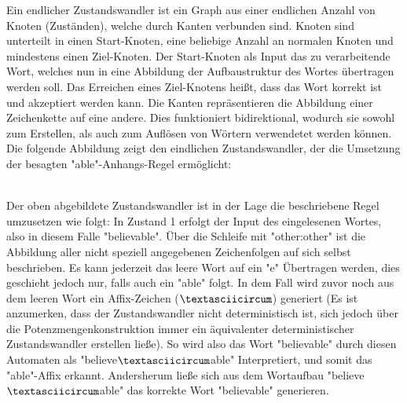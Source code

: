 \documentclass[12pt]{article}
\begin{document}
Ein endlicher Zustandswandler ist ein Graph aus einer endlichen Anzahl von Knoten (Zuständen), welche durch Kanten verbunden sind. Knoten sind unterteilt in einen Start-Knoten, eine beliebige Anzahl an normalen Knoten und mindestens einen Ziel-Knoten. Der Start-Knoten als Input das zu verarbeitende Wort, welches nun in eine Abbildung der Aufbaustruktur des Wortes übertragen werden soll. Das Erreichen eines Ziel-Knotens heißt, dass das Wort korrekt ist und akzeptiert werden kann. Die Kanten repräsentieren die Abbildung einer Zeichenkette auf eine andere. Dies funktioniert bidirektional, wodurch sie sowohl zum Erstellen, als auch zum Auflösen von Wörtern verwendetet werden können. Die folgende Abbildung zeigt den eindlichen Zustandswandler, der die Umsetzung der besagten "able"-Anhangs-Regel ermöglicht:
\\
\\
\begin{center}
\end{center}

Der oben abgebildete Zustandswandler ist in der Lage die beschriebene Regel umzusetzen wie folgt: In Zustand 1 erfolgt der Input des eingelesenen Wortes, also in diesem Falle "believable". Über die Schleife mit "other:other" ist die Abbildung aller nicht speziell angegebenen Zeichenfolgen auf sich selbst beschrieben. Es kann jederzeit das leere Wort auf ein "e" Übertragen werden, dies geschieht jedoch nur, falls auch ein "able" folgt. In dem Fall wird zuvor noch aus dem leeren Wort ein Affix-Zeichen ($\textasciicircum$) generiert (Es ist anzumerken, dass der Zustandswandler nicht deterministisch ist, sich jedoch über die Potenzmengenkonstruktion immer ein äquivalenter deterministischer Zustandswandler erstellen ließe). So wird also das Wort "believable" durch diesen Automaten als "believe$\textasciicircum$able" Interpretiert, und somit das "able"-Affix erkannt. Andersherum ließe sich aus dem Wortaufbau "believe$\textasciicircum$able" das korrekte Wort "believable" generieren. 
\end{document}
